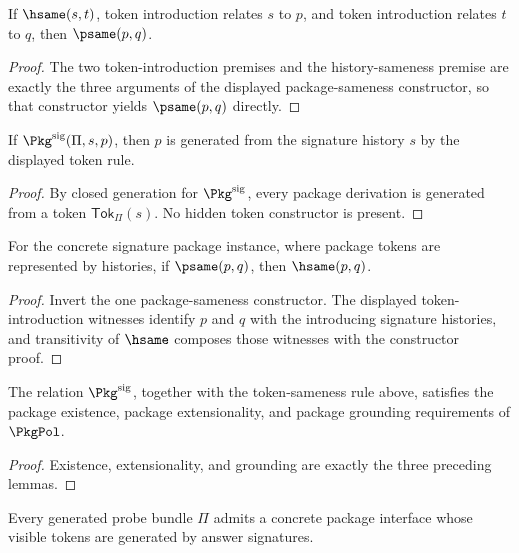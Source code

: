 \begin{lemma}
If $\hsame(s,t)$, token introduction relates $s$ to $p$, and token introduction relates $t$ to $q$, then $\psame(p,q)$.
\end{lemma}
\begin{proof}
The two token-introduction premises and the history-sameness premise are exactly the three arguments of the displayed package-sameness constructor, so that constructor yields $\psame(p,q)$ directly.
\end{proof}

\begin{lemma}
\label{lem:signature-package-grounding}
If \(\Pkg^{\mathrm{sig}}(\Pi,s,p)\), then \(p\) is generated from the signature history \(s\) by the displayed token rule.
\end{lemma}
\begin{proof}
By closed generation for \(\Pkg^{\mathrm{sig}}\), every package derivation is generated from a token \(\mathsf{Tok}_{\Pi}(s)\). No hidden token constructor is present.
\end{proof}

\begin{lemma}
\label{lem:signature-package-psame-implies-hsame}
For the concrete signature package instance, where package tokens are represented by histories, if $\psame(p,q)$, then $\hsame(p,q)$.
\end{lemma}
\begin{proof}
Invert the one package-sameness constructor. The displayed token-introduction witnesses identify \(p\) and \(q\) with the introducing signature histories, and transitivity of \(\hsame\) composes those witnesses with the constructor proof.
\end{proof}

\begin{theorem}
\label{thm:concrete-signature-package-policy}
The relation \(\Pkg^{\mathrm{sig}}\), together with the token-sameness rule above, satisfies the package existence, package extensionality, and package grounding requirements of \(\PkgPol\).
\end{theorem}
\begin{proof}
Existence, extensionality, and grounding are exactly the three preceding lemmas.
\end{proof}

\begin{corollary}
\label{cor:first-concrete-package-interface}
Every generated probe bundle \(\Pi\) admits a concrete package interface whose visible tokens are generated by answer signatures.
\end{corollary}
